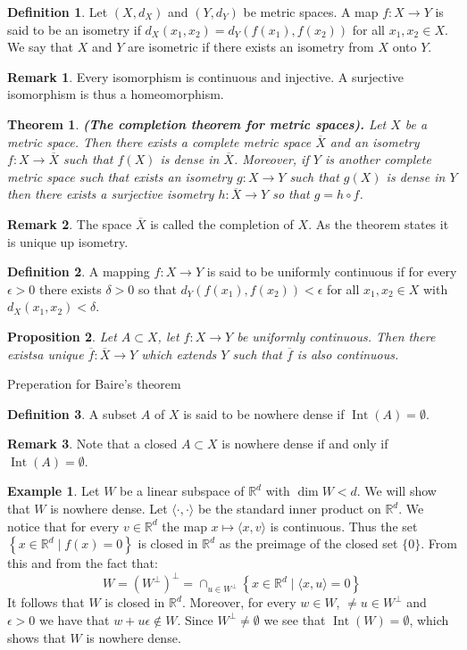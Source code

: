 \documentclass[11pt,a4paper]{article}
\theoremstyle{definition}
\newtheorem{definition}{Definition}[section]
\newtheorem{remark}{Remark}[section]
\newtheorem{example}{Example}[section]
\theoremstyle{plain}
\newtheorem{theorem}{Theorem}[section]
\newtheorem{proposition}[theorem]{Proposition}
\DeclareMathOperator{\Int}{Int}
\newcommand{\R}{\mathbb{R}}
\newcommand{\ip}[2]{\langle #1, #2 \rangle}
\newcommand{\set}[2]{ \left\{ #1 \mid #2 \right\} }
\renewcommand{\tt}[1]{\textnormal{\textbf{(#1).}}} %
\begin{document}
	\begin{definition}
		Let $(X,d_X)$ and $(Y,d_Y)$ be metric spaces. A map $f \colon X \to Y$ 
		is said to be an isometry if $d_X(x_1,x_2) = d_Y(f(x_1),f(x_2))$ for all 
		$x_1,x_2 \in X$. We say that $X$ and $Y$ are isometric if there exists 
		an isometry from $X$ onto $Y$.
	\end{definition}
	\begin{remark}
		Every isomorphism is continuous and injective. A surjective isomorphism
		is thus a homeomorphism.
	\end{remark}
	\begin{theorem}
		\tt{The completion theorem for metric spaces}
		Let $X$ be a metric space. Then there exists a complete metric space
		$\overline{X}$ and an isometry $f \colon X \to \overline{X}$ such that 
		$f(X)$ is dense in $\overline{X}$. Moreover, if $Y$ is another complete 
		metric space such that exists an isometry $g \colon X \to Y$ such that
		$g(X)$ is dense in $Y$ then there exists a surjective isometry
		$h \colon \overline{X} \to Y$ so that $g = h \circ f$.
	\end{theorem}
	\begin{remark}
		The space $\overline{X}$ is called the completion of $X$. As the theorem
		states it is unique up isometry.
	\end{remark}
	\begin{definition}
		A mapping $f \colon X \to Y$ is said to be uniformly continuous if for
		every $\epsilon > 0$ there exists $\delta > 0$ so that 
		$d_Y(f(x_1),f(x_2)) < \epsilon$ for all $x_1,x_2 \in X$ with 
		$d_X(x_1,x_2) < \delta$.
	\end{definition}
	\begin{proposition}
		Let $A \subset X$, let $f \colon X \to Y$ be uniformly continuous.
		Then there existsa unique $\overline{f} \colon \overline{X} \to Y$ 
		which extends $Y$ such that $\overline{f}$ is also continuous.
	\end{proposition}
	Preperation for Baire's theorem
	\begin{definition}
		A subset $A$ of $X$ is said to be nowhere dense if $\Int(A) = \emptyset$.
	\end{definition}
	\begin{remark}
		Note that a closed $A \subset X$ is nowhere dense if and only if 
		$\Int(A) = \emptyset$.
	\end{remark}
	\begin{example}
		Let $W$ be a linear subspace of $\R^d$ with $\dim W < d$. We will show
		that $W$ is nowhere dense. Let $\ip{\cdot}{\cdot}$ be the standard
		inner product on $\R^d$. We notice that for every $v \in \R^d$ the
		map $x \mapsto \ip{x}{v}$ is continuous. Thus the set 
		$\set{x \in \R^d}{f(x) = 0}$ is closed in $\R^d$ as the preimage of the
		closed set $\{0\}$. From this and from the fact that:
		\[
			W = (W^{\perp})^{\perp} = \cap_{u \in W^{\perp}}{\set{x \in \R^d}
			{\ip{x}{u} = 0}}
		\]
		It follows that $W$ is closed in $\R^d$. Moreover, for every $w \in W$,
		$\neq u \in W^{\perp}$ and $\epsilon > 0$ we have that 
		$w+u\epsilon \notin W$. Since $W^{\perp} \neq \emptyset$ we see that
		$\Int(W) = \emptyset$, which shows that $W$ is nowhere dense.
	\end{example}
\end{document}
